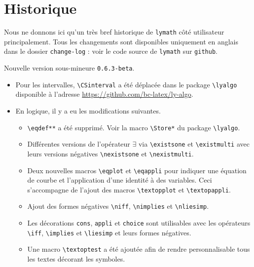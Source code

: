 \documentclass[12pt,a4paper]{article}
\begin{document}
\newpage

\section{Historique}

Nous ne donnons ici qu'un très bref historique de \verb+lymath+ côté utilisateur principalement.
Tous les changements sont disponibles uniquement en anglais dans le dossier \verb+change-log+ : voir le code source de \verb+lymath+ sur \verb+github+.

\begin{description}[leftmargin=1em]
    \setlength\itemsep{1em}



    \item[2019-10-21] Nouvelle version sous-mineure \verb+0.6.3-beta+.
    \begin{itemize}
        \item Pour les intervalles, \verb+\CSinterval+ a été déplacée dans le package \verb+\lyalgo+ disponible à l'adresse \url{https://github.com/bc-latex/ly-algo}.

        \item En logique, il y a eu les modifications suivantes.
        \begin{itemize}
        	\item \verb+\eqdef**+ a été supprimé. Voir la macro \verb+\Store*+ du package \verb+\lyalgo+.

        	\item Différentes versions de l'opérateur $\exists$ via \verb+\existsone+ et \verb+\existmulti+ avec leurs versions négatives \verb+\nexistsone+ et \verb+\nexistmulti+.

        	\item Deux nouvelles macros \verb+\eqplot+ et \verb+\eqappli+ pour indiquer une équation de courbe et l'application d'une identité à des variables. Ceci s'accompagne de l'ajout des macros \verb+\textopplot+ et \verb+\textopappli+.

			\item Ajout des formes négatives \verb+\niff+, \verb+\nimplies+ et \verb+\nliesimp+.

        	\item Les décorations \verb+cons+, \verb+appli+ et \verb+choice+ sont utilisables avec les opérateurs \verb+\iff+, \verb+\implies+ et \verb+\liesimp+ et leurs formes négatives.

        	\item Une macro \verb+\textoptest+ a été ajoutée afin de rendre personnalisable tous les textes décorant les symboles.
        \end{itemize}


\end{itemize}
\end{description}
\end{document}
